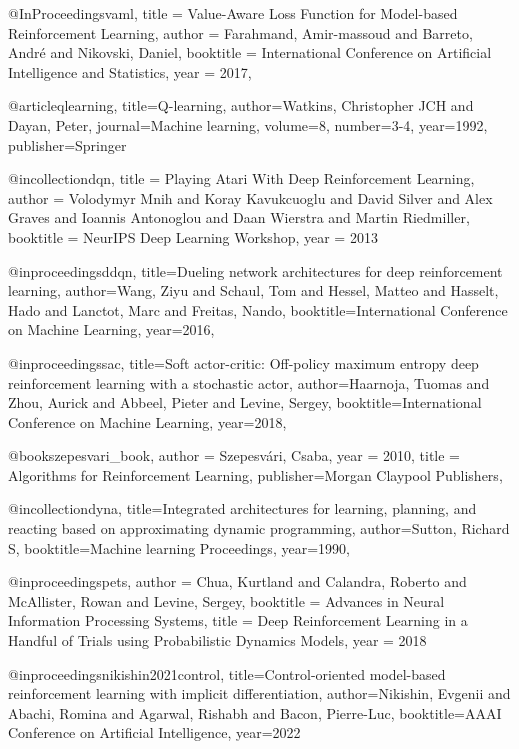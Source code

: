 @InProceedings{vaml,
  title = 	 {{Value-Aware Loss Function for Model-based Reinforcement Learning}},
  author = 	 {Farahmand, Amir-massoud and Barreto, Andr{é} and Nikovski, Daniel},
  booktitle = 	 {International Conference on Artificial Intelligence and Statistics},
  year = 	 {2017},
}

@article{qlearning,
  title={Q-learning},
  author={Watkins, Christopher JCH and Dayan, Peter},
  journal={Machine learning},
  volume={8},
  number={3-4},
  year={1992},
  publisher={Springer}
}

@incollection{dqn,
  title = {Playing Atari With Deep Reinforcement Learning},
  author = {Volodymyr Mnih and Koray Kavukcuoglu and David Silver and Alex Graves and Ioannis Antonoglou and Daan Wierstra and Martin Riedmiller},
  booktitle = {NeurIPS Deep Learning Workshop},
  year = {2013}
}

@inproceedings{ddqn,
  title={Dueling network architectures for deep reinforcement learning},
  author={Wang, Ziyu and Schaul, Tom and Hessel, Matteo and Hasselt, Hado and Lanctot, Marc and Freitas, Nando},
  booktitle={International Conference on Machine Learning},
  year={2016},
}

@inproceedings{sac,
  title={Soft actor-critic: Off-policy maximum entropy deep reinforcement learning with a stochastic actor},
  author={Haarnoja, Tuomas and Zhou, Aurick and Abbeel, Pieter and Levine, Sergey},
  booktitle={International Conference on Machine Learning},
  year={2018},
}

@book{szepesvari_book,
author = {Szepesvári, Csaba},
year = {2010},
title = {Algorithms for Reinforcement Learning},
publisher={Morgan Claypool Publishers},
}

@incollection{dyna,
  title={Integrated architectures for learning, planning, and reacting based on approximating dynamic programming},
  author={Sutton, Richard S},
  booktitle={Machine learning Proceedings},
  year={1990},
}

@inproceedings{pets,
 author = {Chua, Kurtland and Calandra, Roberto and McAllister, Rowan and Levine, Sergey},
 booktitle = {Advances in Neural Information Processing Systems},
 title = {Deep Reinforcement Learning in a Handful of Trials using Probabilistic Dynamics Models},
 year = {2018}
}



@inproceedings{nikishin2021control,
  title={Control-oriented model-based reinforcement learning with implicit differentiation},
  author={Nikishin, Evgenii and Abachi, Romina and Agarwal, Rishabh and Bacon, Pierre-Luc},
  booktitle={AAAI Conference on Artificial Intelligence},
  year={2022}
}


